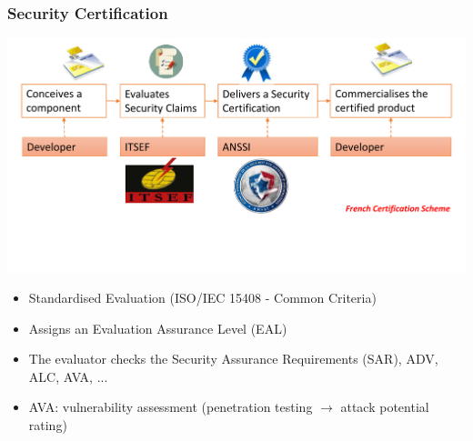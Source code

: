 \begin{frame}
\frametitle{Security Certification}
\centering
\includegraphics[width = .9\textwidth]{figures/ITSEF_nobody.pdf}
\begin{itemize}
\item Standardised Evaluation (\eg ISO/IEC 15408 - Common Criteria)
\item Assigns an Evaluation Assurance Level (EAL)
\item The evaluator checks the Security Assurance Requirements (SAR), \eg ADV, ALC, AVA, ...
\item AVA: vulnerability assessment (penetration testing $\rightarrow$ attack potential rating)
\end{itemize}
\end{frame}


